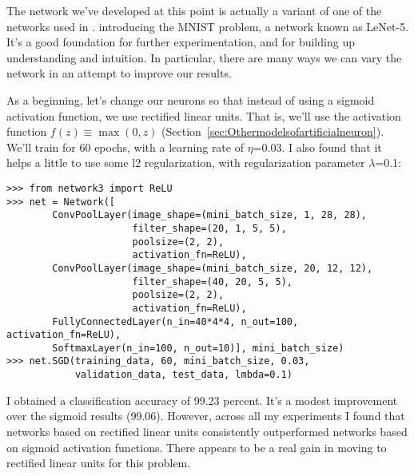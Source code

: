  The network we've developed at this point is actually a variant of one of the networks used in \cite{Lecun98gradient-basedlearning}. introducing the MNIST problem, a network known as LeNet-5. It's a good foundation for further experimentation, and for building up understanding and intuition. In particular, there are many ways we can vary the network in an attempt to improve our results.

As a beginning, let's change our neurons so that instead of using a sigmoid activation function, we use rectified linear units. That is, we'll use the activation function $f(z) \equiv \max (0, z)$ (Section~\ref{sec:Othermodelsofartificialneuron}). We'll train for 60 epochs, with a learning rate of $\eta$=0.03. I also found that it helps a little to use some l2 regularization, with regularization parameter $\lambda$=0.1:
\begin{lstlisting}
>>> from network3 import ReLU
>>> net = Network([
        ConvPoolLayer(image_shape=(mini_batch_size, 1, 28, 28), 
                      filter_shape=(20, 1, 5, 5), 
                      poolsize=(2, 2), 
                      activation_fn=ReLU),
        ConvPoolLayer(image_shape=(mini_batch_size, 20, 12, 12), 
                      filter_shape=(40, 20, 5, 5), 
                      poolsize=(2, 2), 
                      activation_fn=ReLU),
        FullyConnectedLayer(n_in=40*4*4, n_out=100, activation_fn=ReLU),
        SoftmaxLayer(n_in=100, n_out=10)], mini_batch_size)
>>> net.SGD(training_data, 60, mini_batch_size, 0.03, 
            validation_data, test_data, lmbda=0.1)
\end{lstlisting}

I obtained a classification accuracy of 99.23 percent. It's a modest improvement over the sigmoid results (99.06). However, across all my experiments I found that networks based on rectified linear units consistently outperformed networks based on sigmoid activation functions. There appears to be a real gain in moving to rectified linear units for this problem.

